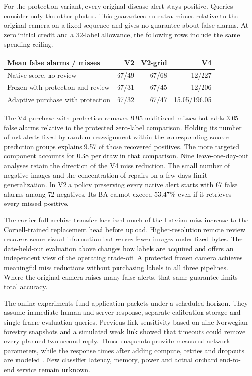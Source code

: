 \newpage
{}
For the protection variant, every original disease alert stays positive. Queries consider only the other photos. This guarantees no extra misses relative to the original camera on a fixed sequence and gives no guarantee about false alarms. At zero initial credit and a 32-label allowance, the following rows include the same spending ceiling.
\begin{center}\small
\begin{tabular}{@{}lrrr@{}}\toprule
Mean false alarms / misses & V2 & V2-grid & V4\\\midrule
Native score, no review &67/49&67/68&12/227\\
Frozen with protection and review &67/31&67/45&12/206\\
Adaptive purchase with protection &67/32&67/47&15.05/196.05\\\bottomrule
\end{tabular}
\end{center}
The V4 purchase with protection removes 9.95 additional misses but adds 3.05 false alarms relative to the protected zero-label comparison. Holding its number of net alerts fixed by random reassignment within the corresponding source prediction groups explains 9.57 of those recovered positives. The more targeted component accounts for 0.38 per draw in that comparison. Nine leave-one-day-out analyses retain the direction of the V4 miss reduction. The small number of negative images and the concentration of repairs on a few days limit generalization. In V2 a policy preserving every native alert starts with 67 false alarms among 72 negatives. Its BA cannot exceed 53.47\% even if it retrieves every missed positive.

The earlier full-archive transfer localized much of the Latvian miss increase to the Cornell-trained replacement head before upload. Higher-resolution remote review recovers some visual information but serves fewer images under fixed bytes. The date-held-out evaluation above changes how labels are acquired and offers an independent view of the operating trade-off. A protected frozen camera achieves meaningful miss reductions without purchasing labels in all three pipelines. Where the original camera raises many false alerts, that same guarantee limits total accuracy.

The online experiments fund application packets under a scheduled horizon. They assume immediate human and server response, separate calibration storage and single-frame evaluation queries. Previous link sensitivity based on nine Norwegian forestry snapshots and a simulated weak link showed that timeouts could remove every planned two-second reply. Those snapshots provide measured network parameters, while the response times after adding compute, retries and dropouts are modeled \cite{forest}. New classifier latency, memory, power and actual orchard end-to-end service remain unknown.

